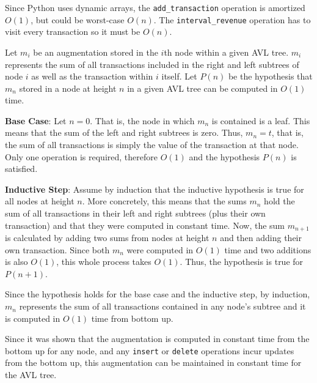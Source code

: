\documentclass[12pt,twoside]{article}
\begin{document}
\begin{problems}
\begin{problemparts}
\end{problemparts}

\newpage
\problem

\begin{problemparts}

\problempart Since Python uses dynamic arrays, the {\tt add\_transaction}
    operation is amortized $ O(1) $, but could be worst-case $ O(n) $. The
    {\tt interval\_revenue} operation has to visit every transaction so it
    must be $ O(n) $.

\problempart Let $ m_i $ be an augmentation stored in the $i$th node within a
    given AVL tree. $ m_i $ represents the sum of all transactions included
    in the right and left subtrees of node $ i $ as well as the transaction
    within $ i $ itself. Let $ P(n) $ be the hypothesis that $ m_n $ stored
    in a node at height $n$ in a given AVL tree can be computed in $ O(1) $
    time.

    {\bf Base Case}: Let $ n = 0 $. That is, the node in which $ m_n $ is
    contained is a leaf. This means that the sum of the left and right
    subtrees is zero. Thus, $ m_n = t $, that is, the sum of all transactions
    is simply the value of the transaction at that node. Only one operation
    is required, therefore $ O(1) $ and the hypothesis $ P(n) $ is satisfied.

    {\bf Inductive Step}: Assume by induction that the inductive hypothesis
    is true for all nodes at height $ n $. More concretely, this means that
    the sums $m_n$ hold the sum of all transactions in their left and right
    subtrees (plus their own transaction) and that they were computed in
    constant time. Now, the sum $ m_{n + 1} $ is calculated by adding two
    sums from nodes at height $n$ and then adding their own transaction.
    Since both $m_n$ were computed in $ O(1) $ time and two additions is also
    $ O(1) $, this whole process takes $ O(1) $. Thus, the hypothesis is true
    for $ P(n + 1) $.

    Since the hypothesis holds for the base case and the inductive step, by
    induction, $m_n$ represents the sum of all transactions contained in any
    node's subtree and it is computed in $ O(1) $ time from bottom up.

    \smallbreak

    Since it was shown that the augmentation is computed in constant time
    from the bottom up for any node, and any {\tt insert} or {\tt delete}
    operations incur updates from the bottom up, this augmentation can be
    maintained in constant time for the AVL tree.


\end{problemparts}
\end{problems}
\end{document}
